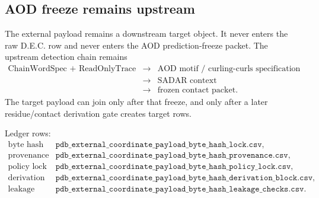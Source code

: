 \subsection{AOD freeze remains upstream}

The external payload remains a downstream target object. It never enters the raw D.E.C. row and never enters the AOD prediction-freeze packet. The upstream detection chain remains\[
\begin{array}{rcl}
\text{ChainWordSpec + ReadOnlyTrace} &\to& \text{AOD motif / curling-curls specification}\\
&\to& \text{SADAR context}\\
&\to& \text{frozen contact packet}.
\end{array}
\]
The target payload can join only after that freeze, and only after a later residue/contact derivation gate creates target rows.

Ledger rows:
\[
\begin{array}{ll}
\text{byte hash lock} & \texttt{pdb\_external\_coordinate\_payload\_byte\_hash\_lock.csv},\\
\text{provenance} & \texttt{pdb\_external\_coordinate\_payload\_byte\_hash\_provenance.csv},\\
\text{policy lock} & \texttt{pdb\_external\_coordinate\_payload\_byte\_hash\_policy\_lock.csv},\\
\text{derivation block} & \texttt{pdb\_external\_coordinate\_payload\_byte\_hash\_derivation\_block.csv},\\
\text{leakage audit} & \texttt{pdb\_external\_coordinate\_payload\_byte\_hash\_leakage\_checks.csv}.
\end{array}
\]
